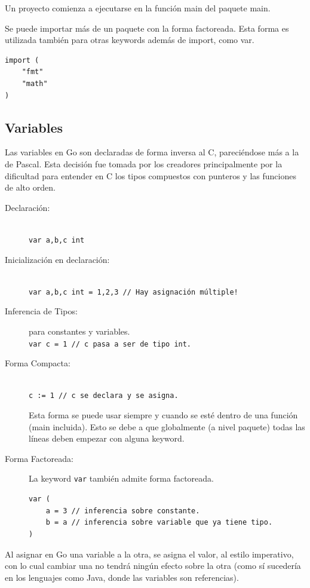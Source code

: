 \documentclass{article}
\begin{document}
Un proyecto comienza a ejecutarse en la función main del paquete main.



Se puede importar más de un paquete con la forma factoreada. Esta forma es utilizada también para otras keywords además de import, como var.

\begin{lstlisting}[caption=Forma Factoreada]
import (
	"fmt" 
	"math"
)
\end{lstlisting}

\subsection{Variables}
Las variables en Go son declaradas de forma inversa al C, pareciéndose más a la de Pascal. Esta decisión fue tomada por los creadores principalmente por la dificultad para entender en C los tipos compuestos con punteros y las funciones de alto orden\cite{dec}.
\begin{description}
	\item[Declaración:]\hfill \\
		\lstinline|var a,b,c int|
	\item[Inicialización en declaración:] \hfill \\
		\lstinline|var a,b,c int = 1,2,3 // Hay asignación múltiple!|
	\item[Inferencia de Tipos:] para constantes y variables. \\
		\lstinline|var c = 1 // c pasa a ser de tipo int.|
	\item[Forma Compacta:] \hfill \\
		\lstinline|c := 1 // c se declara y se asigna.|
	
	Esta forma se puede usar siempre y cuando se esté dentro de una función (main incluida). Esto se debe a que globalmente (a nivel paquete) todas las líneas deben empezar con alguna keyword. 
	\item[Forma Factoreada:] La keyword \lstinline|var| también admite forma factoreada.
\begin{lstlisting}
var (
	a = 3 // inferencia sobre constante.
	b = a // inferencia sobre variable que ya tiene tipo.
)
\end{lstlisting}
\end{description}

Al asignar en Go una variable a la otra, se asigna el valor, al estilo imperativo, con lo cual cambiar una no tendrá ningún efecto sobre la otra (como sí sucedería en los lenguajes como Java, donde las variables son referencias).
\end{document}
